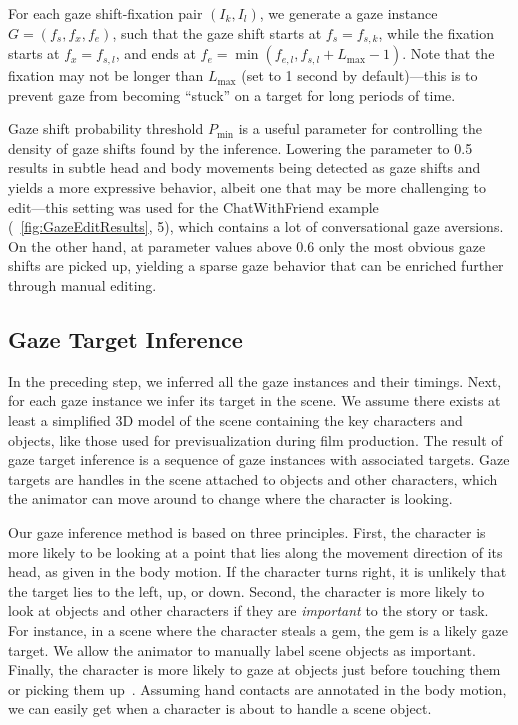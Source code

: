 For each gaze shift-fixation pair $(I_k, I_l)$, we generate a gaze instance $G = (f_s, f_x, f_e)$, such that the gaze shift starts at $f_s = f_{s,k}$, while the fixation starts at $f_x = f_{s,l}$, and ends at $f_e = \mathop{min}(f_{e,l}, f_{s,l} + L_\mathrm{max} - 1)$. Note that the fixation may not be longer than $L_\mathrm{max}$ (set to 1 second by default)---this is to prevent gaze from becoming ``stuck'' on a target for long periods of time.

Gaze shift probability threshold $P_\mathrm{min}$ is a useful parameter for controlling the density of gaze shifts found by the inference. Lowering the parameter to 0.5 results in subtle head and body movements being detected as gaze shifts and yields a more expressive behavior, albeit one that may be more challenging to edit---this setting was used for the ChatWithFriend example (~\ref{fig:GazeEditResults}, 5), which contains a lot of conversational gaze aversions. On the other hand, at parameter values above 0.6 only the most obvious gaze shifts are picked up, yielding a sparse gaze behavior that can be enriched further through manual editing.

\subsection{Gaze Target Inference}
\label{sec:GazeTargetInference}

In the preceding step, we inferred all the gaze instances and their timings. Next, for each gaze instance we infer its target in the scene. We assume there exists at least a simplified 3D model of the scene containing the key characters and objects, like those used for previsualization during film production. The result of gaze target inference is a sequence of gaze instances with associated targets. Gaze targets are handles in the scene attached to objects and other characters, which the animator can move around to change where the character is looking.

Our gaze inference method is based on three principles. First, the character is more likely to be looking at a point that lies along the movement direction of its head, as given in the body motion. If the character turns right, it is unlikely that the target lies to the left, up, or down. Second, the character is more likely to look at objects and other characters if they are \emph{important} to the story or task. For instance, in a scene where the character steals a gem, the gem is a likely gaze target. We allow the animator to manually label scene objects as important. Finally, the character is more likely to gaze at objects just before touching them or picking them up~\citep{johansson2001eyehead}. Assuming hand contacts are annotated in the body motion, we can easily get when a character is about to handle a scene object.

